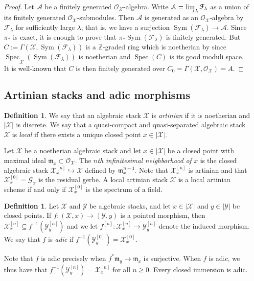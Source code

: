 \documentclass[a4paper]{amsart}
\theoremstyle{plain}
\theoremstyle{definition}
\newtheorem{definition}[theorem]{Definition}
\theoremstyle{remark}
\numberwithin{equation}{section}
\newcommand{\inj}{\hookrightarrow} %
\newcommand{\stX}{\mathcal{X}} %
\newcommand{\stY}{\mathcal{Y}} %
\newcommand{\stG}{\mathcal{G}} %
\newcommand{\idm}{\mathfrak{m}} %
\newcommand\ZZ{\mathbb{Z}}
\newcommand\cA{\mathcal{A}}
\newcommand\cF{\mathcal{F}}
\newcommand\cX{\mathcal{X}}
\newcommand\oh{\mathcal{O}}
\DeclareMathOperator{\Spec}{Spec}
\DeclareMathOperator{\Sym}{Sym}
\newcommand{\dlim}{\varinjlim}
\begin{document}
\begin{proof}
Let $\cA$ be a finitely generated $\oh_{\cX}$-algebra. Write $\cA = \dlim_{\lambda} \cF_{\lambda}$ as a union of its finitely generated $\oh_{\cX}$-submodules. Then $\cA$ is generated as an $\oh_{\cX}$-algebra by $\cF_\lambda$ for sufficiently large $\lambda$; that is,  we have a surjection $\Sym(\cF_\lambda) \to \cA$. 
Since $\pi_*$ is exact, it is enough to prove that $\pi_* \Sym(\cF_\lambda)$ is finitely generated. 
But $C:= \Gamma(\cX, \Sym(\cF_\lambda))$ is a $\ZZ$-graded ring which is noetherian by \cite[Thm.~4.16(x)]{alper-good} since $\underline{\Spec}_{\cX}(\Sym(\cF_\lambda))$ is noetherian and $\Spec(C)$ is its good moduli space. It is well-known that $C$ is then finitely generated over $C_0=\Gamma(\cX, \oh_{\cX})=A$. 
\end{proof}

\subsection{Artinian stacks and adic morphisms}

\begin{definition}
We say that an algebraic stack $\stX$ is \emph{artinian} if it is noetherian
and $|\stX|$ is discrete. We say that a quasi-compact and quasi-separated
algebraic stack $\stX$ is \emph{local} if there exists a unique closed point
$x\in |\stX|$.
\end{definition}

Let $\stX$ be a noetherian algebraic stack and let $x\in |\stX|$ be a closed
point with maximal ideal $\idm_x \subset \oh_{\cX}$. The \emph{$n$th infinitesimal neighborhood of
  $x$} is the closed algebraic stack $\stX_x^{[n]}\inj \stX$ defined by
$\idm_x^{n+1}$. Note that $\stX_x^{[n]}$ is artinian and that $\stX_x^{[0]}=\stG_x$ is
the residual gerbe. A local artinian stack $\stX$ is a local artinian scheme
if and only if $\stX_x^{[0]}$ is the spectrum of a field.
\begin{definition} \label{D:adic}
Let $\stX$ and $\stY$ be algebraic stacks, and let $x\in |\stX|$ and $y\in
|\stY|$ be closed points. If $f\colon (\stX,x)\to (\stY,y)$ is a pointed
morphism, then $\stX_x^{[n]}\subseteq f^{-1}(\stY_y^{[n]})$ and we let
$f^{[n]}\colon \stX_x^{[n]}\to \stY_y^{[n]}$ denote the induced morphism.
We say that $f$ is \emph{adic} if $f^{-1}(\stY_y^{[0]})=\stX_x^{[0]}$.
\end{definition}

Note that $f$ is adic precisely when $f^*\idm_y\to \idm_x$ is surjective.
When $f$ is adic, we thus have that $f^{-1}(\stY_y^{[n]})=\stX_x^{[n]}$ for all
$n\geq 0$. Every closed immersion is adic.
\end{document}
